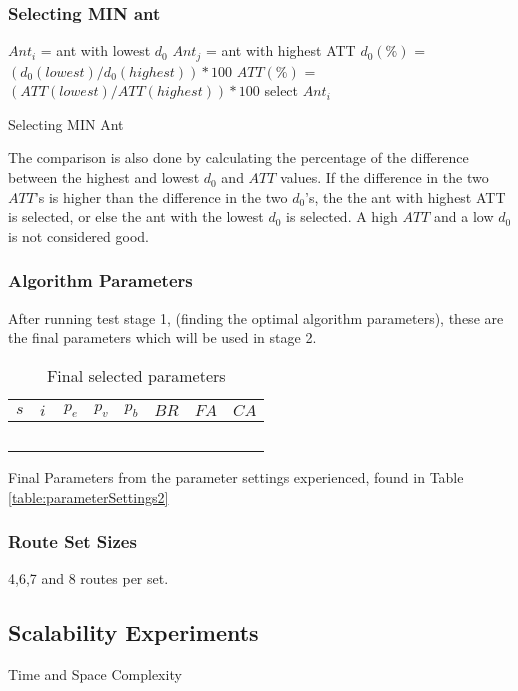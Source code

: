 \subsubsection{Selecting MIN ant}
\begin{algorithm}[H]
$Ant_{i}$ = ant with lowest $d_0$\;
$Ant_{j}$ = ant with highest ATT\;
{
	$d_0(\%)$ = $(d_0(lowest) / d_0(highest))*100$\;
	$ATT(\%)$ = $(ATT(lowest) / ATT(highest))*100$\;
	{
		select $Ant_{i}$
	}
}
 \caption{Selecting MIN Ant}

\end{algorithm}

The comparison is also done by calculating the percentage of the difference between the highest and lowest $d_0$ and $ATT$ values. If the difference in the two $ATT$'s is higher than the difference in the two $d_0$'s, the the ant with highest ATT is selected, or else the ant with the lowest $d_0$ is selected. A high $ATT$ and a low $d_0$ is not considered good. 

\subsubsection{Algorithm Parameters}
After running test stage 1, (finding the optimal algorithm parameters), these are the final parameters which will be used in stage 2.

\begin{table}[H]
	\centering
    \begin{tabular}{|l|l|l|l|l|l|l|l|}
 	\hline
 	$s$ & $i$ & $p_{e}$ & $p_{v}$ & $p_{b}$ & $BR$ & $FA$ & $CA$  \\
 	\hline
    ~ & ~ & ~ & ~ & ~ & ~ & ~ & ~ \\
	\hline
    \end{tabular}
    \caption {Final selected parameters}
    Final Parameters from the parameter settings experienced, found in Table \vref{table:parameterSettings2}
    \label{table:finalParameters}
	\end{table}

\subsubsection{Route Set Sizes}
4,6,7 and 8 routes per set.

\subsection{Scalability Experiments}
Time and Space Complexity
